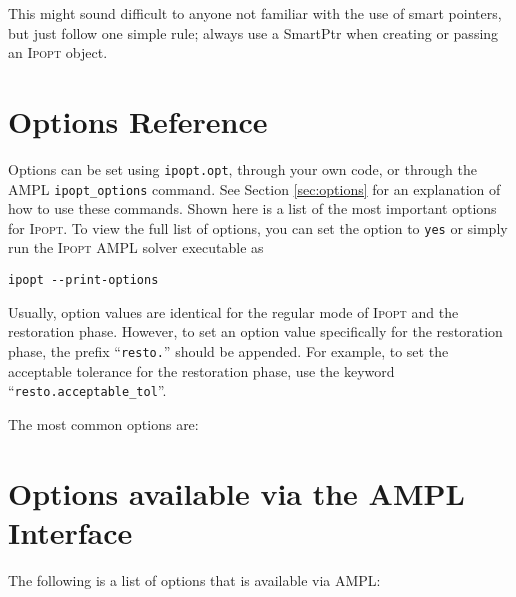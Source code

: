 \documentclass[10pt]{article}
\newcommand{\Ipopt}{\textsc{Ipopt}\xspace}
\begin{document}
This might sound difficult to anyone not familiar with the use of
smart pointers, but just follow one simple rule; always use a SmartPtr
when creating or passing an \Ipopt object.

\section{Options Reference} \label{app.options_ref}

Options can be set using {\tt ipopt.opt}, through your own code, or
through the AMPL {\tt ipopt\_options} command. See Section
\ref{sec:options} for an explanation of how to use these commands.
Shown here is a list of the most important options for \Ipopt. To view
the full list of options, you can set the option 
to {\tt yes} or simply run the \Ipopt AMPL solver executable as
\begin{verbatim}
ipopt --print-options
\end{verbatim}

Usually, option values are identical for the regular mode of \Ipopt
and the restoration phase.  However, to set an option value
specifically for the restoration phase, the prefix ``\texttt{resto.}''
should be appended.  For example, to set the acceptable tolerance for
the restoration phase, use the keyword
``\texttt{resto.acceptable\_tol}''.

\medskip
\noindent
The most common options are:



\section{Options available via the AMPL Interface}

The following is a list of options that is available via AMPL:


%
%

\end{document}

